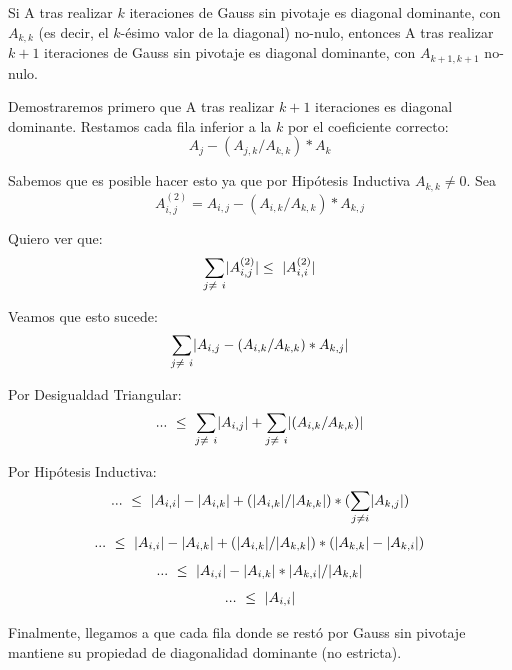 \par Si A tras realizar $k$ iteraciones de Gauss sin pivotaje es diagonal dominante, con $A_{k, k}$ (es decir, el $k$-\'esimo valor de la diagonal) no-nulo, entonces A tras realizar $k+1$ iteraciones de Gauss sin pivotaje es diagonal dominante, con $A_{k+1, k+1}$ no-nulo.
\par Demostraremos primero que A tras realizar $k+1$ iteraciones es diagonal dominante.
Restamos cada fila inferior a la $k$ por el coeficiente correcto:
\begin{equation}
A_j - (A_{j, k} / A_{k, k}) * A_k
\end{equation}
\par Sabemos que es posible hacer esto ya que por Hip\'otesis Inductiva $A_{k, k} \neq 0$.
Sea
\begin{equation}
A_{i, j}^{(2)} = A_{i, j} - (A_{i, k} / A_{k, k}) * A_{k, j}
\end{equation}
\par Quiero ver que:
\begin{equation}
\sum_{j\neq\ i}\abs{A_{i, j}^{(2)}}\leq\ \abs{A_{i, i}^{(2)}}
\end{equation}
\par Veamos que esto sucede:
\begin{equation}
\sum_{j\neq\ i}\abs{A_{i, j} - (A_{i, k} / A_{k, k}) * A_{k, j}}
\end{equation}
\par Por Desigualdad Triangular:
\begin{equation}
    ...\ \leq\ \sum_{j\neq\ i}\abs{A_{i,j}} + \sum_{j\neq\ i}\abs{(A_{i, k} / A_{k, k})}
\end{equation}
\par Por Hip\'otesis Inductiva:
\begin{equation}
    ...\ \leq\ \abs{A_{i, i}} - \abs{A_{i, k}} + (\abs{A_{i, k}}/ \abs{A_{k, k}})*(\sum_{j\neq i}\abs{A_{k, j}})
\end{equation}
\begin{equation}
    ...\ \leq\ \lvert A_{i, i}\rvert - \lvert A_{i, k}\rvert + (\lvert A_{i, k}\rvert/ \lvert A_{k, k}\rvert)*(\lvert A_{k, k}\rvert-\lvert A_{k, i}\rvert)
\end{equation}
\begin{equation}
    ...\ \leq\ \lvert A_{i, i}\rvert - \lvert A_{i, k}\rvert * \lvert A_{k, i}\rvert / \lvert A_{k, k}\rvert
\end{equation}
\begin{equation}
    ...\ \leq\ \lvert A_{i, i}\rvert 
\end{equation}
\par Finalmente, llegamos a que cada fila donde se rest\'o por Gauss sin pivotaje mantiene su propiedad de diagonalidad dominante (no estricta).
